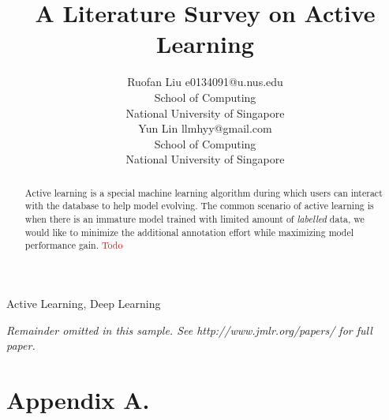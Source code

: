 \documentclass[twoside,11pt]{article}
\newcommand{\ruofan}[1]{\textcolor{red}{#1}}
\begin{document}
\title{A Literature Survey on Active Learning}

\author{\name Ruofan Liu \email e0134091@u.nus.edu \\
       \addr School of Computing\\
       National University of Singapore\\
       \AND
       \name Yun Lin \email llmhyy@gmail.com \\
       \addr School of Computing\\
       National University of Singapore\\}


\maketitle
\begin{abstract}%
Active learning is a special machine learning algorithm during which users can interact with the database to help model evolving. The common scenario of active learning is when there is an immature model trained with limited amount of \textit{labelled} data, we would like to minimize the additional annotation effort while maximizing model performance gain. \ruofan{Todo}
\end{abstract}

\begin{keywords}
  Active Learning, Deep Learning
\end{keywords}





{\noindent \em Remainder omitted in this sample. See http://www.jmlr.org/papers/ for full paper.}





\newpage

\appendix
\section*{Appendix A.}
\label{app:theorem}

\end{document}
